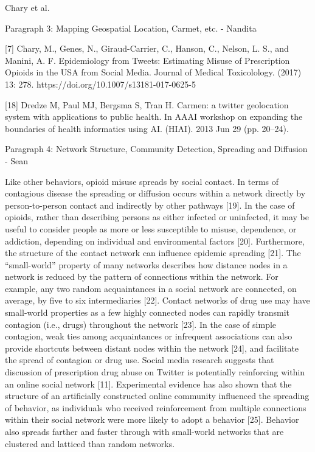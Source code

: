 \documentclass[sigconf]{acmart}
\begin{document}
Chary et al. 


Paragraph 3: Mapping Geospatial Location, Carmet, etc. - Nandita

[7] Chary, M., Genes, N., Giraud-Carrier, C., Hanson, C., Nelson, L. S., and Manini, A. F. Epidemiology from Tweets: Estimating Misuse of Prescription Opioids in the USA from Social Media. Journal of Medical Toxicolology. (2017) 13: 278. https://doi.org/10.1007/s13181-017-0625-5 

[18] Dredze M, Paul MJ, Bergsma S, Tran H. Carmen: a twitter geolocation system with applications to public health. In AAAI workshop on expanding the boundaries of health informatics using AI. (HIAI). 2013 Jun 29 (pp. 20–24).



Paragraph 4: Network Structure, Community Detection, Spreading and Diffusion - Sean

Like other behaviors, opioid misuse spreads by social contact. In terms of contagious disease the spreading or diffusion occurs within a network directly by person-to-person contact and indirectly by other pathways [19]. In the case of opioids, rather than describing persons as either infected or uninfected, it may be useful to consider people as more or less susceptible to misuse, dependence, or addiction, depending on individual and environmental factors [20]. Furthermore, the structure of the contact network can influence epidemic spreading [21]. The “small-world” property of many networks describes how distance nodes in a network is reduced by the pattern of connections within the network. For example, any two random acquaintances in a social network are connected, on average, by five to six intermediaries [22]. Contact networks of drug use may have small-world properties as a few highly connected nodes can rapidly transmit contagion (i.e., drugs) throughout the network [23]. In the case of simple contagion, weak ties among acquaintances or infrequent associations can also provide shortcuts between distant nodes within the network [24], and facilitate the spread of contagion or drug use. Social media research suggests that discussion of prescription drug abuse on Twitter is potentially reinforcing within an online social network [11]. Experimental evidence has also shown that the structure of an artificially constructed online community influenced the spreading of behavior, as individuals who received reinforcement from multiple connections within their social network were more likely to adopt a behavior [25]. Behavior also spreads farther and faster through with small-world networks that are clustered and latticed than random networks.
\end{document}
